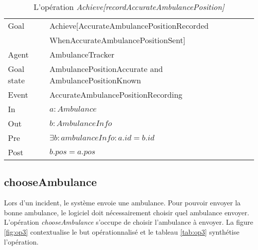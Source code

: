 	\begin{table}[!h] \centering
		\begin{tabularx}{\textwidth}{|l|X|} \hline
			Goal & Achieve[AccurateAmbulancePositionRecorded\\ &WhenAccurateAmbulancePositionSent] \\ \hline
			Agent & AmbulanceTracker \\ \hline
			Goal state & AmbulancePositionAccurate and AmbulancePositionKnown \\ \hline %
			Event & AccurateAmbulancePositionRecording \\ \hline
			In & $a: Ambulance$ \\ \hline
			Out & $b: AmbulanceInfo$ \\ \hline
			Pre & $\exists b: ambulanceInfo : a.id = b.id$ \\ \hline
			Post & $b.pos = a.pos$ \\ \hline
		\end{tabularx}
		\caption{L'opération \textit{Achieve[recordAccurateAmbulancePosition]}}\label{tab:op2}
	\end{table}

\subsection{chooseAmbulance}
	
	Lors d'un incident, le système envoie une ambulance. Pour pouvoir envoyer
	la bonne ambulance, le logiciel doit nécessairement choisir quel
	ambulance envoyer. L'opération \textit{chooseAmbulance} s'occupe de choisir
	l'ambulance à envoyer. La figure \ref{fig:op3} contextualise le but
	opérationnalisé et le tableau \ref{tab:op3} synthétise l'opération.
	
	
